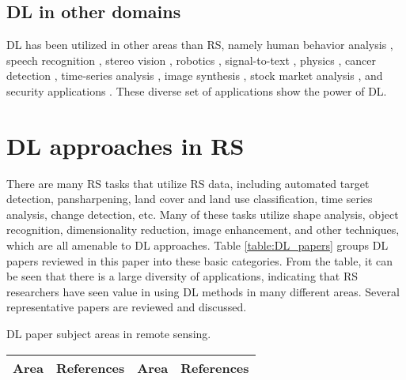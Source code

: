 \documentclass[12pt]{spieman}
\newcommand{\ParSection}[1]{}
\begin{document}
\begin{spacing}{1}
\subsection{DL in other domains}
DL has been utilized in other areas than RS, namely human behavior analysis \cite{baccouche2011sequential,shou2017cdc,tran2015learning,wang2016temporal} , speech recognition \cite{dahl2012context, hinton2012deepneural,graves2013speech} , stereo vision \cite{luo2016efficient} , robotics \cite{levine2016learning} , signal-to-text \cite{venugopalan2015sequence, collobert2011deep, venugopalan2014translating, TanC16, karpathy2015deep} , physics \cite{baldi2014searching, wu2015galileo} , cancer detection \cite{cruz2013deep, fakoor2013using, sirinukunwattana2016locality} , time-series analysis \cite{langkvist2014review, sarkar2015early, kuremoto2014time} , image synthesis \cite{dosovitskiy2015learning,zhao2016energy,reed2016learning,berthelot2017began,TanCAT17,gregor2015draw, radford2015unsupervised} , stock market analysis \cite{ding2015deepStock} , and security applications \cite{yuan2014droid} . These diverse set of applications show the power of DL.


\section{DL approaches in RS}
\label{sec:DL_Approaches_RS}

\ParSection{Table of remote sensing areas (JOHN-DONE)}
There are many RS tasks that utilize RS data, including automated target detection, pansharpening, land cover and land use classification, time series analysis, change detection, etc. Many of these tasks utilize shape analysis, object recognition, dimensionality reduction, image enhancement, and other techniques, which are all amenable to DL approaches. Table \ref{table:DL_papers} groups DL papers reviewed in this paper into these basic categories. From the table, it can be seen that there is a large diversity of applications, indicating that RS researchers have seen value in using DL methods in many different areas. Several representative papers are reviewed and discussed.

\caption{DL paper subject areas in remote sensing.}
\label{table:DL_papers}
\begin{center}
\begin{tabular}{|l|l|l|l|} %
\hline
\rule[-1ex]{0pt}{3.5ex}  \textbf{Area} & \textbf{References} & \textbf{Area} & \textbf{References} \\
\hline
\hline


\end{tabular}
\end{center}
\end{spacing}
\end{document}
